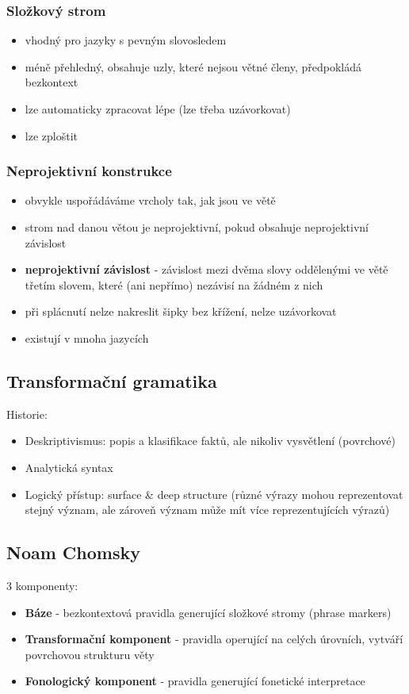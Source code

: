 \documentclass[a4paper]{article}
\newcommand{\imwc}[2]{\textbf{#1} - #2}
\begin{document}
\subsubsection*{Složkový strom}
\begin{itemize}
\item vhodný pro jazyky s pevným slovosledem
\item méně přehledný, obsahuje uzly, které nejsou větné členy, předpokládá bezkontext
\item lze automaticky zpracovat lépe (lze třeba uzávorkovat)
\item lze zploštit
\end{itemize}

\subsubsection*{Neprojektivní konstrukce}
\begin{itemize}
\item obvykle uspořádáváme vrcholy tak, jak jsou ve větě
\item strom nad danou větou je neprojektivní, pokud obsahuje neprojektivní závislost
\item \imwc{neprojektivní závislost}{závislost mezi dvěma slovy oddělenými ve větě třetím slovem, které (ani nepřímo) nezávisí na žádném z nich}
\item při splácnutí nelze nakreslit šipky bez křížení, nelze uzávorkovat
\item existují v mnoha jazycích
\end{itemize}

\subsection*{Transformační gramatika}
Historie:
\begin{itemize}
\item Deskriptivismus: popis a klasifikace faktů, ale nikoliv vysvětlení (povrchové)
\item Analytická syntax
\item Logický přístup: surface \& deep structure (různé výrazy mohou reprezentovat stejný význam, ale zároveň význam může mít více reprezentujících výrazů)
\end{itemize}

\subsection*{Noam Chomsky}
3 komponenty: \begin{itemize}
\item \imwc{Báze}{bezkontextová pravidla generující složkové stromy (phrase markers)}
\item \imwc{Transformační komponent}{pravidla operující na celých úrovních, vytváří povrchovou strukturu věty}
\item \imwc{Fonologický komponent}{pravidla generující fonetické interpretace}
\end{itemize}
\end{document}
